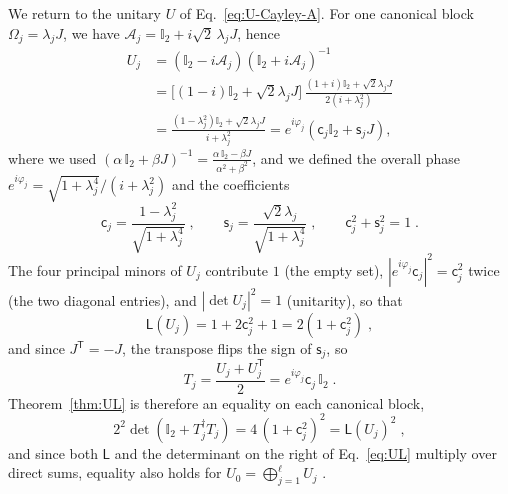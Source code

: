 \documentclass[aps,prl,twocolumn,superscriptaddress,reprint,longbibliography,nofootinbib]{revtex4-2}
\newcommand{\trans}{\mathsf{T}}
\begin{document}
We return to the unitary $U$ of Eq.~\eqref{eq:U-Cayley-A}. For one canonical block $\Omega_j=\lambda_jJ$, we have $\mathcal{A}_j=\mathbb{I}_2+i\sqrt2\,\lambda_jJ$, hence
\begin{equation}
\begin{split}
    U_j&=(\mathbb{I}_2-i\mathcal{A}_j)(\mathbb{I}_2+i\mathcal{A}_j)^{-1}\\
    &=\big[(1-i)\mathbb{I}_2+\sqrt2\lambda_jJ\big]\,\frac{(1+i)\mathbb{I}_2+\sqrt2\lambda_jJ}{2(i+\lambda_j^2)}\\
    &=\frac{(1-\lambda_j^2)\mathbb{I}_2+\sqrt2\lambda_jJ}{i+\lambda_j^2}=e^{i\varphi_j}\left(\mathsf{c}_j\mathbb{I}_2+\mathsf{s}_jJ\right),
\end{split}
\end{equation} 
where we used $(\alpha\,\mathbb{I}_2+\beta J)^{-1}=\frac{\alpha\,\mathbb{I}_2-\beta J}{\alpha^2+\beta^2}$, and we defined the overall phase $e^{i\varphi_j}=\sqrt{1+\lambda_j^4}/(i+\lambda_j^2)$ and the coefficients
\begin{equation}
    \mathsf{c}_j=\frac{1-\lambda_j^2}{\sqrt{1+\lambda_j^4}}\;,\qquad \mathsf{s}_j=\frac{\sqrt2\lambda_j}{\sqrt{1+\lambda_j^4}}\;,\qquad \mathsf{c}_j^2+\mathsf{s}_j^2=1\;.
\end{equation}
The four principal minors of $U_j$ contribute $1$ (the empty set), $|e^{i\varphi_j}\mathsf{c}_j|^2=\mathsf{c}_j^2$ twice (the two diagonal entries), and $|\det U_j|^2=1$ (unitarity), so that
\begin{equation}
    \mathsf{L}(U_j)=1+2\mathsf{c}_j^2+1=2(1+\mathsf{c}_j^2)\;,
\end{equation}
and since $J^{\trans}=-J$, the transpose flips the sign of $\mathsf{s}_j$, so
\begin{equation}
    T_j=\frac{U_j+U_j^{\trans}}{2}=e^{i\varphi_j}\mathsf{c}_j\,\mathbb{I}_2\;.
\end{equation}
Theorem~\ref{thm:UL} is therefore an equality on each canonical block,
\begin{equation}
    2^2\det(\mathbb{I}_2+T_j^\dagger T_j)=4\,(1+\mathsf{c}_j^2)^2=\mathsf{L}(U_j)^2\;,
\end{equation}
and since both $\mathsf{L}$ and the determinant on the right of Eq.~\eqref{eq:UL} multiply over direct sums, equality also holds for $U_0=\bigoplus_{j=1}^{\ell}U_j$ .
\end{document}

